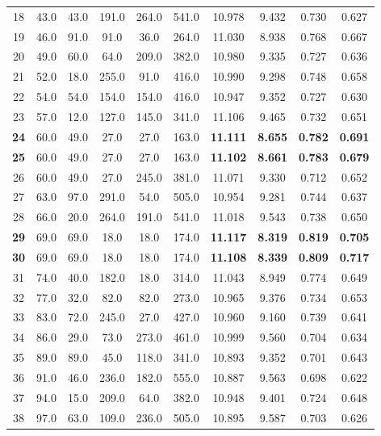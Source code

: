 \begin{table}
\begin{tabular}{c|c|c|c|c|c|c|c|c|c}
		18 & 43.0 & 43.0 & 191.0 & 264.0 & 541.0 & 10.978 & 9.432 & 0.730 & 0.627\\
		19 & 46.0 & 91.0 & 91.0 & 36.0 & 264.0 & 11.030 & 8.938 & 0.768 & 0.667\\
		20 & 49.0 & 60.0 & 64.0 & 209.0 & 382.0 & 10.980 & 9.335 & 0.727 & 0.636\\
		21 & 52.0 & 18.0 & 255.0 & 91.0 & 416.0 & 10.990 & 9.298 & 0.748 & 0.658\\
		22 & 54.0 & 54.0 & 154.0 & 154.0 & 416.0 & 10.947 & 9.352 & 0.727 &  0.630\\
		23 & 57.0 & 12.0 & 127.0 & 145.0 & 341.0 & 11.106 & 9.465 & 0.732 & 0.651\\
		\textbf{24} & 60.0 & 49.0 & 27.0 & 27.0 & 163.0 & \textbf{11.111} & \textbf{8.655} & \textbf{0.782} & \textbf{0.691}\\
		\textbf{25} & 60.0 & 49.0 & 27.0 & 27.0 & 163.0 & \textbf{11.102} & \textbf{8.661} & \textbf{0.783} & \textbf{0.679}\\
		26 & 60.0 & 49.0 & 27.0 & 245.0 & 381.0 & 11.071 & 9.330 & 0.712 & 0.652\\
		27 & 63.0 & 97.0 & 291.0 & 54.0 & 505.0 & 10.954 & 9.281 & 0.744 & 0.637\\
		28 & 66.0 & 20.0 & 264.0 & 191.0 & 541.0 & 11.018 & 9.543 & 0.738 & 0.650\\
		\textbf{29} & 69.0 & 69.0 & 18.0 & 18.0 & 174.0 & \textbf{11.117} & \textbf{8.319} & \textbf{0.819} & \textbf{0.705}\\
		\textbf{30} & 69.0 & 69.0 & 18.0 & 18.0 & 174.0 & \textbf{11.108} & \textbf{8.339} & \textbf{0.809} & \textbf{0.717}\\
		31 & 74.0 & 40.0 & 182.0 & 18.0 & 314.0 & 11.043 & 8.949 & 0.774 & 0.649\\
		32 & 77.0 & 32.0 & 82.0 & 82.0 & 273.0 & 10.965 & 9.376 & 0.734 & 0.653\\
		33 & 83.0 & 72.0 & 245.0 & 27.0 & 427.0 & 10.960 & 9.160 & 0.739 & 0.641\\
		34 & 86.0 & 29.0 & 73.0 & 273.0 & 461.0 & 10.999 & 9.560 & 0.704 & 0.634\\
		35 & 89.0 & 89.0 & 45.0 & 118.0 & 341.0 & 10.893 & 9.352 & 0.701 & 0.643\\
		36 & 91.0 & 46.0 & 236.0 & 182.0 & 555.0 & 10.887 & 9.563 & 0.698 & 0.622\\
		37 & 94.0 & 15.0 & 209.0 & 64.0 & 382.0 & 10.948 & 9.401 & 0.724 & 0.648\\
		38 & 97.0 & 63.0 & 109.0 & 236.0 & 505.0 & 10.895 & 9.587 & 0.703 & 0.626\\

\end{tabular}
\end{table}
